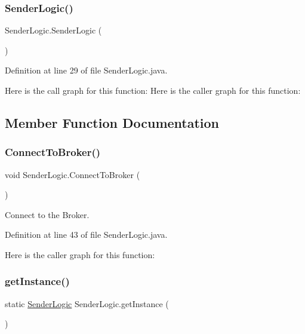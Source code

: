 \subsubsection{\texorpdfstring{Sender\+Logic()}{SenderLogic()}}
{\footnotesize\ttfamily Sender\+Logic.\+Sender\+Logic (\begin{DoxyParamCaption}{ }\end{DoxyParamCaption})}



Definition at line 29 of file Sender\+Logic.\+java.

Here is the call graph for this function\+:
Here is the caller graph for this function\+:


\subsection{Member Function Documentation}
\mbox{\label{class_sender_logic_a3f1fe663014baf7e3bbc5060740a665b}} 
\subsubsection{\texorpdfstring{Connect\+To\+Broker()}{ConnectToBroker()}}
{\footnotesize\ttfamily void Sender\+Logic.\+Connect\+To\+Broker (\begin{DoxyParamCaption}{ }\end{DoxyParamCaption})}

Connect to the Broker. 

Definition at line 43 of file Sender\+Logic.\+java.

Here is the caller graph for this function\+:
\mbox{\label{class_sender_logic_a9a5c16eb2a183e6d1ea994016830d3c9}} 
\subsubsection{\texorpdfstring{get\+Instance()}{getInstance()}}
{\footnotesize\ttfamily static \hyperlink{class_sender_logic}{Sender\+Logic} Sender\+Logic.\+get\+Instance (\begin{DoxyParamCaption}{ }\end{DoxyParamCaption})\hspace{0.3cm}{\ttfamily [static]}}




